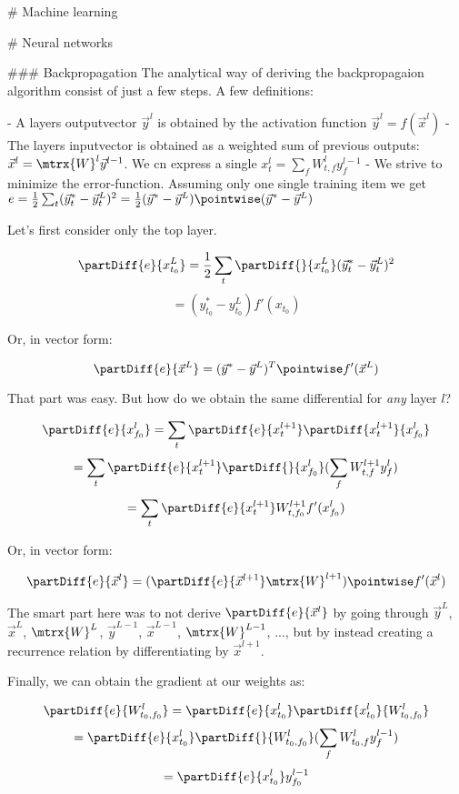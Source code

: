 # Machine learning

# Neural networks

### Backpropagation
The analytical way of deriving the backpropagaion algorithm consist of just a few steps. 
A few definitions: 


	- A layers outputvector $\vec{y}^l$ is obtained by the activation function $\vec{y}^l = f(\vec{x}^l) $
	- The layers inputvector is obtained as a weighted sum of previous outputs: $\vec{x}^l = \mtrx{W}^l \vec{y}^{l-1} $. We cn express a single $x_t^l = \sum_f W_{t,f}^l y_f^{l-1}$
	- We strive to minimize the error-function. Assuming only one single training item we get $e = \frac{1}{2} \sum_t (\vec{y}^*_t - \vec{y}^L_t)^2 = \frac{1}{2} (\vec{y}^* - \vec{y}^L) \pointwise (\vec{y}^* - \vec{y}^L) $


Let's first consider only the top layer. 

$$  \partDiff{e}{x_{t_0}^L} = \frac{1}{2} \sum_t \partDiff{}{x_{t_0}^L} (\vec{y}^*_t - \vec{y}^L_t)^2 $$
$$ = (y_{t_0}^* - y_{t_0}^L) f'(x_{t_0}) $$

Or, in vector form: 

$$ \partDiff{e}{\vec{x}^L} = (\vec{y}^* - \vec{y}^L)^T \pointwise f'(\vec{x}^L)  $$


That part was easy. But how do we obtain the same differential for \emph{any} layer $l$?

$$ \partDiff{e}{x_{f_0}^l} = \sum_t \partDiff{e}{x_t^{l+1}} \partDiff{x_t^{l+1}}{x_{f_0}^l}  $$
$$                         = \sum_t \partDiff{e}{x_t^{l+1}} \partDiff{}{x_{f_0}^l} ( \sum_f W_{t,f}^{l+1} y_f^l ) $$
$$                         = \sum_t \partDiff{e}{x_t^{l+1}} W_{t,f_0}^{l+1} f'(x_{f_0}^l)  $$

Or, in vector form: 

$$ \partDiff{e}{\vec{x}^l} = ( \partDiff{e}{\vec{x}^{l+1}} \mtrx{W}^{l+1} ) \pointwise f'(\vec{x}^l)  $$

The smart part here was to not derive $ \partDiff{e}{\vec{x}^l} $ by going through $\vec{y}^L$, $\vec{x}^L$, $\mtrx{W}^L$, $\vec{y}^{L-1}$, $\vec{x}^{L-1}$, $\mtrx{W}^{L-1}$, ..., but by instead creating a recurrence relation by differentiating by $\vec{x}^{l+1}$.

Finally, we can obtain the gradient at our weights as: 

$$ \partDiff{e}{W_{t_0, f_0}^l} = \partDiff{e}{x_{t_0}^l} \partDiff{x_{t_0}^l}{W_{t_0, f_0}^l}   $$
$$                              = \partDiff{e}{x_{t_0}^l} \partDiff{}{W_{t_0, f_0}^l} ( \sum_f W_{t_0, f}^l y_f^{l-1} ) $$
$$                              = \partDiff{e}{x_{t_0}^l} y_{f_0}^{l-1} $$

